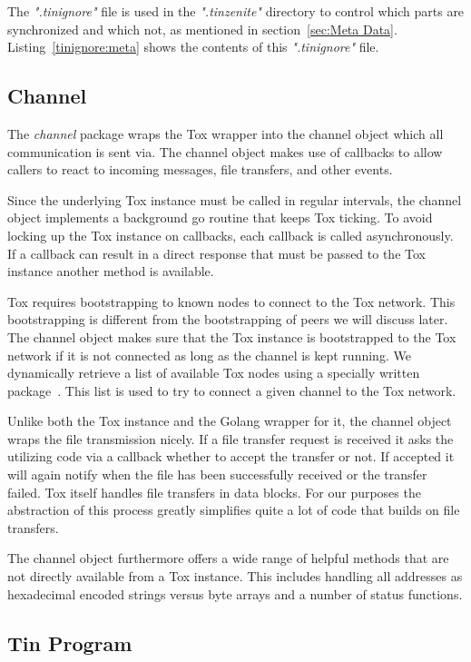 The \textit{".tinignore"} file is used in the \textit{".tinzenite"} directory to control which parts are synchronized and which not, as mentioned in section~\ref{sec:Meta Data}.
Listing~\ref{tinignore:meta} shows the contents of this \textit{".tinignore"} file.

\subsection{Channel}
\label{sub:Channel}

The \emph{channel} package wraps the Tox wrapper into the channel object which all communication is sent via.
The channel object makes use of callbacks to allow callers to react to incoming messages, file transfers, and other events.

Since the underlying Tox instance must be called in regular intervals, the channel object implements a background go routine that keeps Tox ticking.
To avoid locking up the Tox instance on callbacks, each callback is called asynchronously.
If a callback can result in a direct response that must be passed to the Tox instance another method is available.

Tox requires bootstrapping to known nodes to connect to the Tox network.
This bootstrapping is different from the bootstrapping of peers we will discuss later.
The channel object makes sure that the Tox instance is bootstrapped to the Tox network if it is not connected as long as the channel is kept running.
We dynamically retrieve a list of available Tox nodes using a specially written package~\cite{web:site:github:tox-dynboot}.
This list is used to try to connect a given channel to the Tox network.

Unlike both the Tox instance and the Golang wrapper for it, the channel object wraps the file transmission nicely.
If a file transfer request is received it asks the utilizing code via a callback whether to accept the transfer or not.
If accepted it will again notify when the file has been successfully received or the transfer failed.
Tox itself handles file transfers in data blocks.
For our purposes the abstraction of this process greatly simplifies quite a lot of code that builds on file transfers.

The channel object furthermore offers a wide range of helpful methods that are not directly available from a Tox instance.
This includes handling all addresses as hexadecimal encoded strings versus byte arrays and a number of status functions.

\subsection{Tin Program}
\label{sub:Tin Program}

